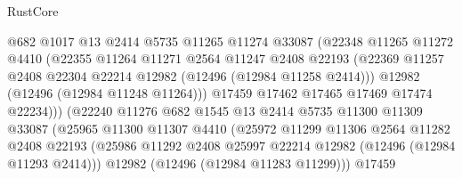 \begin{lexlean}{RustCore}
\begin{coremodule}
                              @682
                              @1017
                              @13
                              @2414
                              @5735
                              @11265
                              @11274
                              @33087
                              (@22348
                                @11265
                                @11272
                                @4410
                                (@22355
                                  @11264
                                  @11271
                                  @2564
                                  @11247
                                  @2408
                                  @22193
                                  (@22369
                                    @11257
                                    @2408
                                    @22304
                                    @22214
                                    @12982
                                    (@12496 (@12984 @11258 @2414)))
                                  @12982
                                  (@12496 (@12984 @11248 @11264)))
                                @17459
                                @17462
                                @17465
                                @17469
                                @17474
                                @22234)))
                          (@22240
                            @11276
                            @682
                            @1545
                            @13
                            @2414
                            @5735
                            @11300
                            @11309
                            @33087
                            (@25965
                              @11300
                              @11307
                              @4410
                              (@25972
                                @11299
                                @11306
                                @2564
                                @11282
                                @2408
                                @22193
                                (@25986
                                  @11292
                                  @2408
                                  @25997
                                  @22214
                                  @12982
                                  (@12496 (@12984 @11293 @2414)))
                                @12982
                                (@12496 (@12984 @11283 @11299)))
                              @17459

\end{coremodule}
\end{lexlean}
